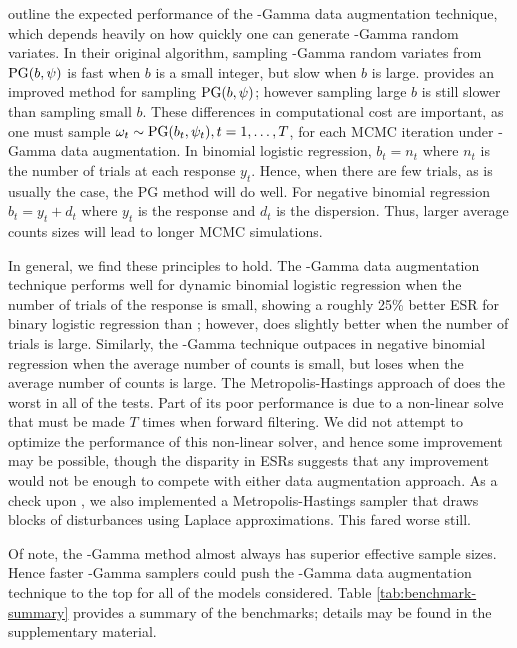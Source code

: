 \citet{polson-etal-2013} outline the expected performance of the \Polya-Gamma
data augmentation technique, which depends heavily on how quickly one can
generate \Polya-Gamma random variates.  In their original algorithm, sampling
\Polya-Gamma random variates from $\text{PG}(b,\psi)$ is fast when $b$ is a small
integer, but slow when $b$ is large. \citet{windle-thesis-2013} provides an
improved method for sampling $\text{PG}(b,\psi)$; however sampling large $b$ is still
slower than sampling small $b$.  These differences in computational cost are
important, as one must sample $\omega_t \sim \text{PG}(b_t, \psi_t), t=1,\ldots,T$,
for each MCMC iteration under \Polya-Gamma data augmentation.  In binomial
logistic regression, $b_t = n_t$ where $n_t$ is the number of trials at each
response $y_t$.  Hence, when there are few trials, as is usually the case, the
PG method will do well.  For negative binomial regression $b_t = y_t + d_t$
where $y_t$ is the response and $d_t$ is the dispersion.  Thus, larger average
counts sizes will lead to longer MCMC simulations.

In general, we find these principles to hold.  The \Polya-Gamma data
augmentation technique performs well for dynamic binomial logistic regression
when the number of trials of the response is small, showing a roughly 25\%
better ESR for binary logistic regression than \citet{fussl-etal-2013}; however,
\citet{fussl-etal-2013} does slightly better when the number of trials is large.
Similarly, the \Polya-Gamma technique outpaces
\citet{fruhwirth-schnatter-etal-2009} in negative binomial regression when the
average number of counts is small, but loses when the average number of counts
is large.  The Metropolis-Hastings approach of \citet{migon-etal-2013} does the
worst in all of the tests.  Part of its poor performance is due to a non-linear
solve that must be made $T$ times when forward filtering.  We did not attempt to
optimize the performance of this non-linear solver, and hence some improvement
may be possible, though the disparity in ESRs suggests that any improvement
would not be enough to compete with either data augmentation approach.  As a
check upon \citet{migon-etal-2013}, we also implemented a Metropolis-Hastings
sampler that draws blocks of disturbances using Laplace approximations.  This
fared worse still.

Of note, the \Polya-Gamma method almost always has superior effective sample
sizes.  Hence faster \Polya-Gamma samplers could push the \Polya-Gamma data
augmentation technique to the top for all of the models considered.  Table
\ref{tab:benchmark-summary} provides a summary of the benchmarks; details may be
found in the supplementary material.

